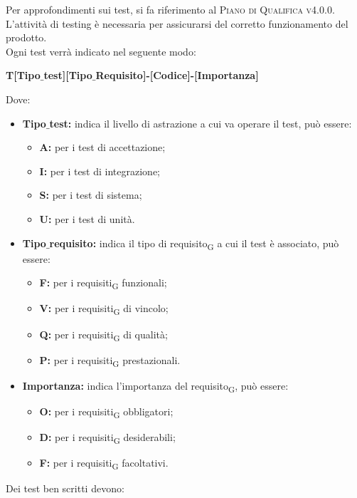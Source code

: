     Per approfondimenti sui test, si fa riferimento al \textsc{Piano di Qualifica v4.0.0}.
    L'attività di testing è necessaria per assicurarsi del corretto funzionamento del prodotto.\\Ogni test verrà indicato nel seguente modo:\\
    \begin{center}
    	\textbf{T[Tipo$\_$test][Tipo$\_$Requisito]-[Codice]-[Importanza]}
    \end{center}
    Dove:
    \begin{itemize}
    	\item \textbf{Tipo$\_$test:} indica il livello di astrazione a cui va operare il test, può essere:
    	\begin{itemize}
    		\item \textbf{A:} per i test di accettazione;
    		\item \textbf{I:} per i test di integrazione;
    		\item \textbf{S:} per i test di sistema;
    		\item \textbf{U:} per i test di unità.
    	\end{itemize}
    	\item \textbf{Tipo$\_$requisito:} indica il tipo di requisito\textsubscript{G} a cui il test è associato, può essere:
    	\begin{itemize}
    		\item \textbf{F:} per i requisiti\textsubscript{G} funzionali;
    		\item \textbf{V:} per i requisiti\textsubscript{G} di vincolo;
    		\item \textbf{Q:} per i requisiti\textsubscript{G} di qualità;
    		\item \textbf{P:} per i requisiti\textsubscript{G} prestazionali.
    	\end{itemize}
    	\item \textbf{Importanza:} indica l'importanza del requisito\textsubscript{G}, può essere:
    	\begin{itemize}
    		\item \textbf{O:} per i requisiti\textsubscript{G} obbligatori;
    		\item \textbf{D:} per i requisiti\textsubscript{G} desiderabili;
    		\item \textbf{F:} per i requisiti\textsubscript{G} facoltativi.
    	\end{itemize}
    \end{itemize}
    Dei test ben scritti devono:
